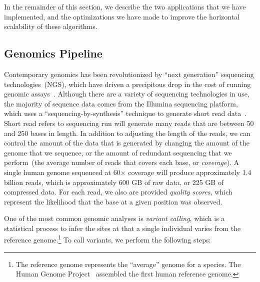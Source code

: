 \documentclass[10pt]{report} %
\begin{document}
In the remainder of this section, we describe the two applications that we have implemented, and the
optimizations we have made to improve the horizontal scalability of these algorithms.

\subsection{Genomics Pipeline}
\label{sec:genomics-pipeline}

Contemporary genomics has been revolutionized by ``next generation'' sequencing
technologies~(NGS), which have driven a precipitous drop in the cost of running genomic
assays~\cite{nhgri}. Although there are a variety of sequencing technologies in use, the majority of
sequence data comes from the Illumina sequencing platform, which uses a ``sequencing-by-synthesis''
technique to generate short read data~\cite{metzker09}. Short read refers to 
sequencing run will generate many reads that are between 50 and 250 bases in length. In addition to
adjusting the length of the reads, we can control the amount of the data that is generated by
changing the amount of the genome that we sequence, or the amount of redundant sequencing that
we perform~(the average number of reads that covers each base, or \emph{coverage}). A single
human genome sequenced at 60$\times$ coverage will produce approximately 1.4 billion reads,
which is approximately 600 GB of raw data, or 225 GB of compressed data. For each read, we also
are provided \emph{quality scores}, which represent the likelihood that the base at a given position
was observed.

One of the most common genomic analyses is \emph{variant calling}, which is a statistical process to
infer the sites at that a single individual varies from the reference genome.\footnote{The
reference genome represents the ``average'' genome for a species. The Human Genome
Project~\cite{lander01} assembled the first human reference genome.} To call variants, we perform the
following steps:
\end{document}
